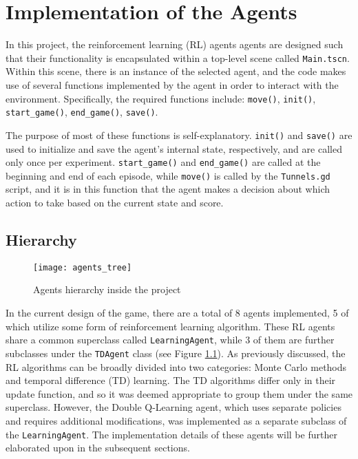\chapter{Implementation of the Agents}
\label{implOfAgents}
In this project, the reinforcement learning (RL) agents agents are designed such that their functionality is encapsulated within a top-level scene called \texttt{Main.tscn}. Within this scene, there is an instance of the selected agent, and the code makes use of several functions implemented by the agent in order to interact with the environment. Specifically, the required functions include: \texttt{move()}, \texttt{init()}, \texttt{start\_game()}, \texttt{end\_game()}, \texttt{save()}.

The purpose of most of these functions is self-explanatory. \texttt{init()} and \texttt{save()} are used to initialize and save the agent's internal state, respectively, and are called only once per experiment. \texttt{start\_game()} and \texttt{end\_game()} are called at the beginning and end of each episode, while \texttt{move()} is called by the \texttt{Tunnels.gd} script, and it is in this function that the agent makes a decision about which action to take based on the current state and score.

\section{Hierarchy}
\begin{figure}[h]
    \centering
    \texttt{[image: agents\_tree]}
    \caption{Agents hierarchy inside the project}
    \label{fig:agents_tree}
\end{figure}

In the current design of the game, there are a total of 8 agents implemented, 5 of which utilize some form of reinforcement learning algorithm. These RL agents share a common superclass called \texttt{LearningAgent}, while 3 of them are further subclasses under the \texttt{TDAgent} class (see Figure \ref{fig:agents_tree}). As previously discussed, the RL algorithms can be broadly divided into two categories: Monte Carlo methods and temporal difference (TD) learning. The TD algorithms differ only in their update function, and so it was deemed appropriate to group them under the same superclass. However, the Double Q-Learning agent, which uses separate policies and requires additional modifications, was implemented as a separate subclass of the \texttt{LearningAgent}. The implementation details of these agents will be further elaborated upon in the subsequent sections. 

